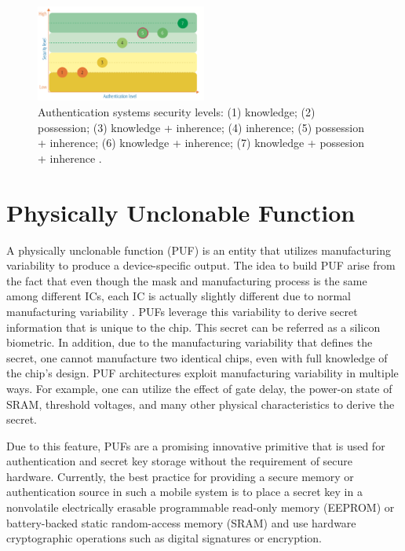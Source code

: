 \begin{figure}[tph!]
    \centerline{\includegraphics[width={0.5\textwidth}]{images/authentication}}
    \caption{Authentication systems security levels: (1) knowledge; (2) possession; (3) knowledge + inherence; (4) inherence; (5) possession + inherence; (6) knowledge + inherence; (7) knowledge + possesion + inherence \cite{Galdi2018ExploringNA}.}
    \label{fig:authentication}
\end{figure}


\section{Physically Unclonable Function}
A physically unclonable function (PUF) is an entity that utilizes manufacturing variability to produce a device-specific output. The idea to build PUF arise from the fact that even though the mask and manufacturing process is the same among different ICs, each IC is actually slightly different due to normal manufacturing variability \cite{retrospective}. PUFs leverage this variability to derive secret information that is unique to the chip. This secret can be referred as a silicon biometric.
In addition, due to the manufacturing variability that defines the secret, one cannot manufacture two identical chips, even with full knowledge of the chip’s design. PUF architectures exploit manufacturing variability in multiple ways. For example, one can utilize the effect of gate delay, the power-on state of SRAM, threshold voltages, and many other physical characteristics to derive the secret.

Due to this feature, PUFs are a promising innovative primitive that is used for authentication and secret key storage without the requirement of secure hardware. Currently, the best practice for providing a secure memory or authentication source in such a mobile system is to place a secret key in a nonvolatile electrically erasable programmable read-only memory (EEPROM) or battery-backed static random-access memory (SRAM) and use hardware cryptographic operations such as digital signatures or encryption.

